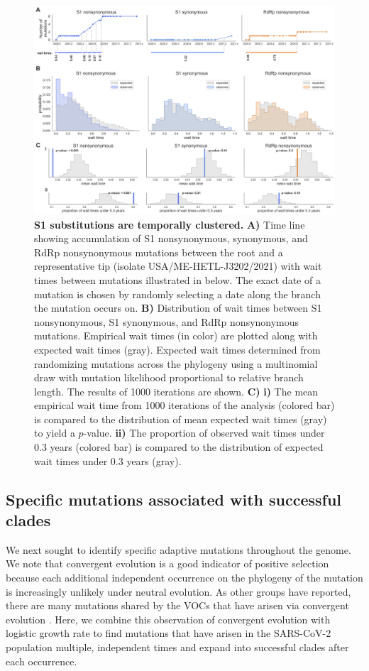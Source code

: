 \documentclass[11pt,oneside,letterpaper]{article}
\begin{document}
\begin{figure}[h!]
	\centerline{\includegraphics[scale=0.5]{fig3_waittimes.png}}
	\caption{\textbf{S1 substitutions are temporally clustered.}
	\textbf{A)} Time line showing accumulation of S1 nonsynonymous, synonymous, and RdRp nonsynonymous mutations between the root and a representative tip (isolate USA/ME-HETL-J3202/2021) with wait times between mutations illustrated in below. The exact date of a mutation is chosen by randomly selecting a date along the branch the mutation occurs on. \textbf{B)} Distribution of wait times between S1 nonsynonymous, S1 synonymous, and RdRp nonsynonymous mutations. Empirical wait times (in color) are plotted along with expected wait times (gray). Expected wait times determined from randomizing mutations across the phylogeny using a multinomial draw with mutation likelihood proportional to relative branch length. The results of 1000 iterations are shown. \textbf{C)} \textbf{i)} The mean empirical wait time from 1000 iterations of the analysis (colored bar) is compared to the distribution of mean expected wait times (gray) to yield a $p$-value. \textbf{ii)} The proportion of observed wait times under 0.3 years (colored bar) is compared to the distribution of expected wait times under 0.3 years (gray).
	}
	\label{fig:waittimes}
\end{figure}

\subsection*{Specific mutations associated with successful clades}
We next sought to identify specific adaptive mutations throughout the genome. 
We note that convergent evolution is a good indicator of positive selection because each additional independent occurrence on the phylogeny of the mutation is increasingly unlikely under neutral evolution. 
As other groups have reported, there are many mutations shared by the VOCs that have arisen via convergent evolution \cite{Van_Dorp2020-ox, Rochman2021-sv, Martin2021-lj}. 
Here, we combine this observation of convergent evolution with logistic growth rate to find mutations that have arisen in the SARS-CoV-2 population multiple, independent times and expand into successful clades after each occurrence.
\end{document}
